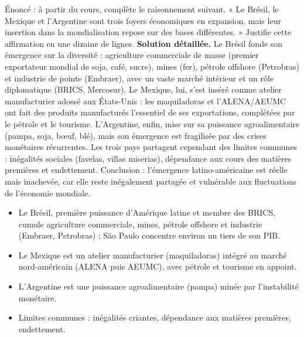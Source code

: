 \documentclass[11pt]{article}
\newcommand{\cle}[1]{{\popxbold\color{popdark}#1}}
\begin{document}
\begin{exoresolu}
Énoncé : à partir du cours, complète le raisonnement suivant. « Le Brésil, le Mexique et l'Argentine sont trois foyers économiques en expansion, mais leur insertion dans la mondialisation repose sur des bases différentes. » Justifie cette affirmation en une dizaine de lignes.
\tcblower
\textbf{Solution détaillée.} Le Brésil fonde son émergence sur la diversité : agriculture commerciale de masse (premier exportateur mondial de soja, café, sucre), mines (fer), pétrole offshore (Petrobras) et industrie de pointe (Embraer), avec un vaste marché intérieur et un rôle diplomatique (BRICS, Mercosur). Le Mexique, lui, s'est inséré comme atelier manufacturier adossé aux États-Unis : les maquiladoras et l'ALENA/AEUMC ont fait des produits manufacturés l'essentiel de ses exportations, complétées par le pétrole et le tourisme. L'Argentine, enfin, mise sur sa puissance agroalimentaire (pampa, soja, bœuf, blé), mais son émergence est fragilisée par des crises monétaires récurrentes. Les trois pays partagent cependant des limites communes : inégalités sociales (favelas, villas miserias), dépendance aux cours des matières premières et endettement. Conclusion : l'émergence latino-américaine est réelle mais inachevée, car elle reste inégalement partagée et vulnérable aux fluctuations de l'économie mondiale.
\end{exoresolu}

\begin{aretenir}
\begin{itemize}
\item Le \cle{Brésil}, première puissance d'Amérique latine et membre des BRICS, cumule agriculture commerciale, mines, pétrole offshore et industrie (Embraer, Petrobras) ; São Paulo concentre environ un tiers de son PIB.
\item Le \cle{Mexique} est un atelier manufacturier (maquiladoras) intégré au marché nord-américain (ALENA puis AEUMC), avec pétrole et tourisme en appoint.
\item L'\cle{Argentine} est une puissance agroalimentaire (pampa) minée par l'instabilité monétaire.
\item Limites communes : inégalités criantes, dépendance aux matières premières, endettement.
\end{itemize}
\end{aretenir}
\end{document}
